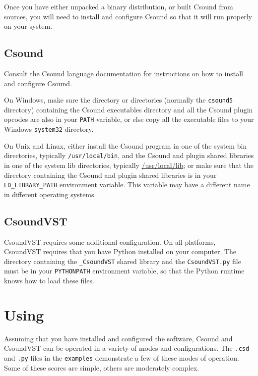 \documentclass[10pt,letterpaper,onecolumn]{book}
\begin{document}
Once you have either unpacked a binary distribution, or built Csound from sources, you will need to install and configure Csound so that it will run properly on your system. 

\subsection{Csound}

Consult the Csound language documentation for instructions on how to install and configure Csound.

On Windows, make sure the directory or directories (normally the \texttt{csound5} directory) containing the Csound executables directory and all the Csound plugin opcodes are also in your \texttt{PATH} variable, or else copy all the executable files to your Windows \texttt{system32} directory.

On Unix and Linux, either install the Csound program in one of the system bin directories, typically \texttt{/usr/local/bin}, and the Csound and plugin shared libraries in one of the system lib directories, typically \url{/usr/local/lib}; or make sure that the directory containing the Csound and plugin shared libraries is in your \texttt{LD\_LIBRARY\_PATH} environment variable. This variable may have a different name in different operating systems.

\subsection{CsoundVST}

CsoundVST requires some additional configuration. On all platforms, CsoundVST requires that you have Python installed on your computer. The directory containing the \texttt{\_CsoundVST} shared library and the \texttt{CsoundVST.py} file must be in your \texttt{PYTHONPATH} environment variable, so that the Python runtime knows how to load these files.

\section{Using}

Assuming that you have installed and configured the software, Csound and CsoundVST can be operated in a variety of modes and configurations. The \texttt{.csd} and \texttt{.py} files in the \texttt{examples} demonstrate a few of these modes of operation. Some of these scores are simple, others are moderately complex. 
\end{document}
